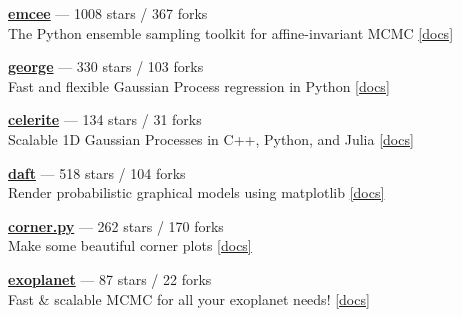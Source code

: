 \item \href{https://github.com/dfm/emcee}{{\bf emcee}} --- 1008 stars / 367 forks \\
The Python ensemble sampling toolkit for affine-invariant MCMC \href{https://emcee.readthedocs.io}{[docs]}

\item \href{https://github.com/dfm/george}{{\bf george}} --- 330 stars / 103 forks \\
Fast and flexible Gaussian Process regression in Python \href{http://george.readthedocs.io}{[docs]}

\item \href{https://github.com/dfm/celerite}{{\bf celerite}} --- 134 stars / 31 forks \\
Scalable 1D Gaussian Processes in C++, Python, and Julia \href{http://celerite.rtfd.io}{[docs]}

\item \href{https://github.com/daft-dev/daft}{{\bf daft}} --- 518 stars / 104 forks \\
Render probabilistic graphical models using matplotlib \href{https://docs.daft-pgm.org}{[docs]}

\item \href{https://github.com/dfm/corner.py}{{\bf corner.py}} --- 262 stars / 170 forks \\
Make some beautiful corner plots \href{http://corner.readthedocs.io}{[docs]}

\item \href{https://github.com/exoplanet-dev/exoplanet}{{\bf exoplanet}} --- 87 stars / 22 forks \\
Fast {\&} scalable MCMC for all your exoplanet needs!  \href{https://docs.exoplanet.codes}{[docs]}